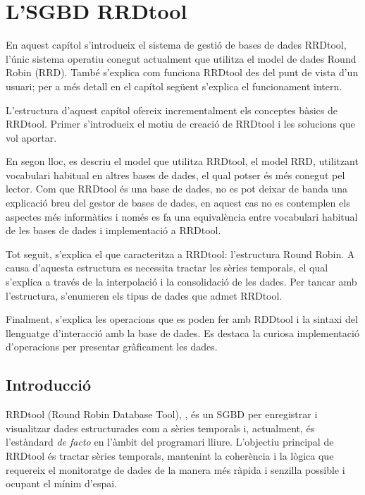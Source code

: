 \chapter{L'SGBD RRDtool}\label{cap:rrdtool}

En aquest capítol s'introdueix el sistema de gestió de bases de dades RRDtool, l'únic sistema operatiu conegut actualment que utilitza el model de dades Round Robin (RRD). 
També s'explica com funciona RRDtool des del punt de vista d'un usuari; per a més detall en el capítol següent s'explica el funcionament intern.  


L'estructura d'aquest capítol ofereix incrementalment els conceptes bàsics de RRDtool. 
Primer s'introdueix el motiu de creació de  RRDtool i les solucions que vol aportar.
 
En segon lloc, es descriu el model que utilitza RRDtool, el model RRD, utilitzant vocabulari  habitual en altres bases de dades, el qual potser és més conegut pel lector. Com que RRDtool és una base de dades, no es pot deixar de banda una explicació breu del gestor de bases de dades, en aquest cas no es contemplen  els aspectes més informàtics i només es fa una equivalència entre vocabulari habitual de les bases de dades i implementació a RRDtool. 


Tot seguit, s'explica el que caracteritza a RRDtool: l'estructura Round Robin. A causa d'aquesta estructura es necessita tractar les sèries temporals, el qual s'explica a través de la interpolació i la consolidació de les dades. Per tancar amb l'estructura, s'enumeren els tipus de dades que admet RRDtool.


Finalment, s'explica les operacions que es poden fer amb RDDtool i la sintaxi del llenguatge d'interacció amb la base de dades. Es destaca la curiosa implementació d'operacions per presentar gràficament les dades.




\section{Introducció}

RRDtool (Round Robin Database Tool), \cite{rrdtool}, és un SGBD per enregistrar i visualitzar dades estructurades com a sèries temporals i, actualment, és l'estàndard \emph{de facto} en l'àmbit del programari lliure. L'objectiu principal de RRDtool és tractar sèries temporals, mantenint la coherència i la lògica que requereix el monitoratge de dades de la manera més ràpida i senzilla possible i ocupant el mínim d'espai.

